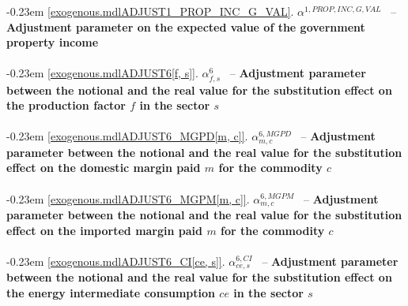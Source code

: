 \documentclass[12pt]{article}
\numberwithin{equation}{section}
\begin{document}
\noindent \kern-0.23em \noindent \begingroup {} \label{exogenous.mdlADJUST1_PROP_INC_G_VAL}\ref{exogenous.mdlADJUST1_PROP_INC_G_VAL}.
         
        \ensuremath{\alpha^{{1},PROP,INC,G,VAL}}~ \endgroup -- \noindent \textbf{Adjustment parameter on the expected value of the government property income}  \\ \\[-8pt]




\noindent \kern-0.23em \noindent \begingroup {} \label{exogenous.mdlADJUST6[f, s]}\ref{exogenous.mdlADJUST6[f, s]}.
         
        \ensuremath{\alpha^{{6}}_{f, s}}~ \endgroup -- \noindent \textbf{Adjustment parameter between the notional and the real value for the substitution effect on the production factor $f$ in the sector $s$}  \\ \\[-8pt]


\noindent \kern-0.23em \noindent \begingroup {} \label{exogenous.mdlADJUST6_MGPD[m, c]}\ref{exogenous.mdlADJUST6_MGPD[m, c]}.
         
        \ensuremath{\alpha^{{6},MGPD}_{m, c}}~ \endgroup -- \noindent \textbf{Adjustment parameter between the notional and the real value for the substitution effect on the domestic margin paid $m$ for the commodity $c$}  \\ \\[-8pt]


\noindent \kern-0.23em \noindent \begingroup {} \label{exogenous.mdlADJUST6_MGPM[m, c]}\ref{exogenous.mdlADJUST6_MGPM[m, c]}.
         
        \ensuremath{\alpha^{{6},MGPM}_{m, c}}~ \endgroup -- \noindent \textbf{Adjustment parameter between the notional and the real value for the substitution effect on the imported margin paid $m$ for the commodity $c$}  \\ \\[-8pt]


\noindent \kern-0.23em \noindent \begingroup {} \label{exogenous.mdlADJUST6_CI[ce, s]}\ref{exogenous.mdlADJUST6_CI[ce, s]}.
         
        \ensuremath{\alpha^{{6},CI}_{ce, s}}~ \endgroup -- \noindent \textbf{Adjustment parameter between the notional and the real value for the substitution effect on the energy intermediate consumption $ce$ in the sector $s$}  \\ \\[-8pt]
\end{document}
